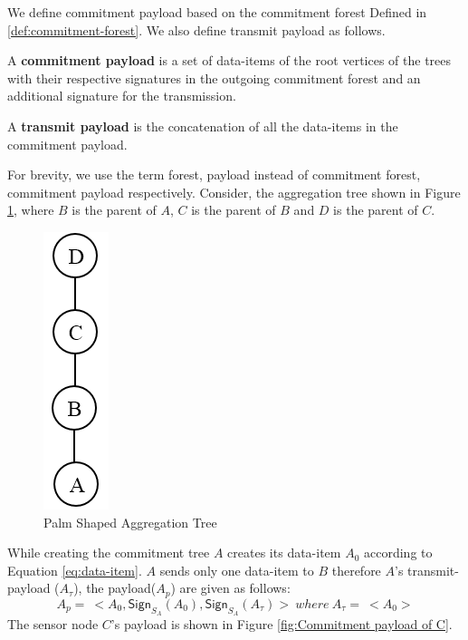 	We define commitment payload based on the commitment forest Defined in \ref{def:commitment-forest}.
	We also define transmit payload as follows.
	\begin{definition}
		A \textbf{commitment payload} is a set of data-items of the root vertices of the trees with their respective signatures in the outgoing commitment forest and an additional signature for the transmission.
	\end{definition}
	\begin{definition}
		A \textbf{transmit payload} is the concatenation of all the data-items in the commitment payload.
	\end{definition}
	For brevity, we use the term forest, payload instead of commitment forest, commitment payload respectively.
	Consider, the aggregation tree shown in Figure \ref{fig:Palm aggregation tree}, where $B$ is the parent of $A$, $C$ is the parent of $B$ and $D$ is the parent of $C$. 
	\begin{figure}[h!]
		\centering
		\includegraphics[scale = 1]{images/palm-aggregation-tree.png}
		\caption{Palm Shaped Aggregation Tree}
		\label{fig:Palm aggregation tree}
	\end{figure}
	While creating the commitment tree $A$ creates its data-item $A_{0}$ according to Equation \ref{eq:data-item}.
	$A$ sends only one data-item to $B$ therefore $A$'s transmit-payload ($A_{\tau}$), the payload($A_{p}$) are given as follows:
	\begin{equation}
		\label{eq:signing-payload}
			A_{p} =\ <A_{0}, \textsf{Sign}_{S_{A}}(A_{0}), \textsf{Sign}_{S_{A}}(A_{\tau}) >\ where\ A_{\tau} =\ < A_{0} > 
	\end{equation}
	The sensor node $C$'s payload is shown in Figure \ref{fig:Commitment payload of C}.
